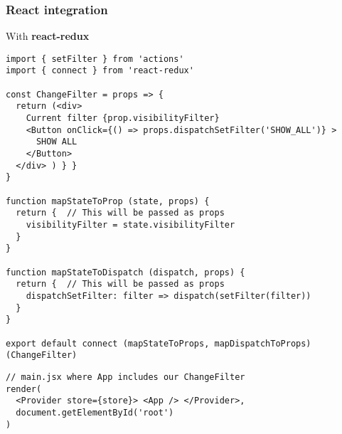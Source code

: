\begin{frame}[fragile]
  \frametitle{React integration}
  \begin{multicols*}{2}
  \footnotesize With \textbf{react-redux}
  \begin{verbatim}
import { setFilter } from 'actions'
import { connect } from 'react-redux'

const ChangeFilter = props => {
  return (<div>
    Current filter {prop.visibilityFilter}
    <Button onClick={() => props.dispatchSetFilter('SHOW_ALL')} >
      SHOW ALL
    </Button>
  </div> ) } }
}

function mapStateToProp (state, props) {
  return {  // This will be passed as props
    visibilityFilter = state.visibilityFilter  
  }
}

function mapStateToDispatch (dispatch, props) {
  return {  // This will be passed as props
    dispatchSetFilter: filter => dispatch(setFilter(filter))
  }
}

export default connect (mapStateToProps, mapDispatchToProps)(ChangeFilter)
  \end{verbatim}
  \columnbreak
  \begin{verbatim}
// main.jsx where App includes our ChangeFilter
render( 
  <Provider store={store}> <App /> </Provider>,
  document.getElementById('root')
)
  \end{verbatim}
  \end{multicols*}
\end{frame}
